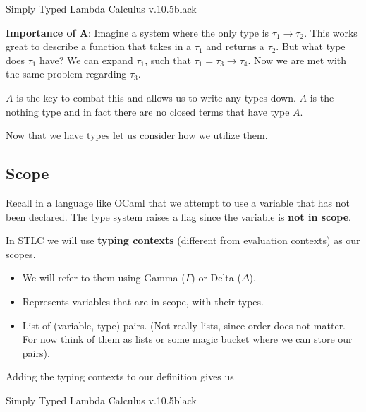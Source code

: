 \documentclass{lecturenotes}
\newcommand{\CC}{\mathbb{C}}
\begin{document}
\begin{center}
\begin{alert}{Simply Typed Lambda Calculus v.1}{0.5\textwidth}{black}
  \begin{syntax}   
    \category[Types]{\tau}
  \end{syntax}
\end{alert}
\end{center}

\textbf{Importance of A}: Imagine a system where the only type is $\tau_1 \rightarrow \tau_2$. 
  This works great to describe a function that takes in a $\tau_1$ and returns a $\tau_2$. 
  But what type does $\tau_1$ have? 
  We can expand $\tau_1$, such that $\tau_1 = \tau_3 \rightarrow \tau_4$. 
  Now we are met with the same problem regarding $\tau_3$. 

$A$ is the key to combat this and allows us to write any types down. 
  $A$ is the nothing type and in fact there are no closed terms that have type $A$. 

Now that we have types let us consider how we utilize them. 

\subsection{Scope}

Recall in a language like OCaml that we attempt to use a variable that has not been declared. 
  The type system raises a flag since the variable is \textbf{not in scope}.

In STLC we will use \textbf{typing contexts} (different from evaluation contexts) as our scopes.

\begin{itemize}
  \item We will refer to them using Gamma ($\Gamma$) or Delta ($\Delta$).
  \item Represents variables that are in scope, with their types.
  \item List of (variable, type) pairs. (Not really lists, since order does not matter. For now think of them as lists or some magic bucket where we can store our pairs).
\end{itemize}

Adding the typing contexts to our definition gives us 

\begin{center}
\begin{alert}{Simply Typed Lambda Calculus v.1}{0.5\textwidth}{black}
  \begin{syntax}   
    \category[Types]{\tau}
    \category[Typing Contexts]{\CC}
      \alternative{\cdot}
  \end{syntax}
\end{alert}
\end{center}
\end{document}
